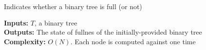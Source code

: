 \begin{algorithm}[H]
\caption{Indicates whether a binary tree is full (or not)}
\textbf{Inputs:} $T$, a binary tree \\
\textbf{Outputs:} The state of fullnes of the initially-provided binary tree \\
\textbf{Complexity:} $O(N)$. Each node is computed against one time
\hline
\begin{algorithmic}[1]
      \State {}
      \State {}
    \Else %
      \State {}
    \EndIf
  \EndFunction
\end{algorithmic}
\end{algorithm}
